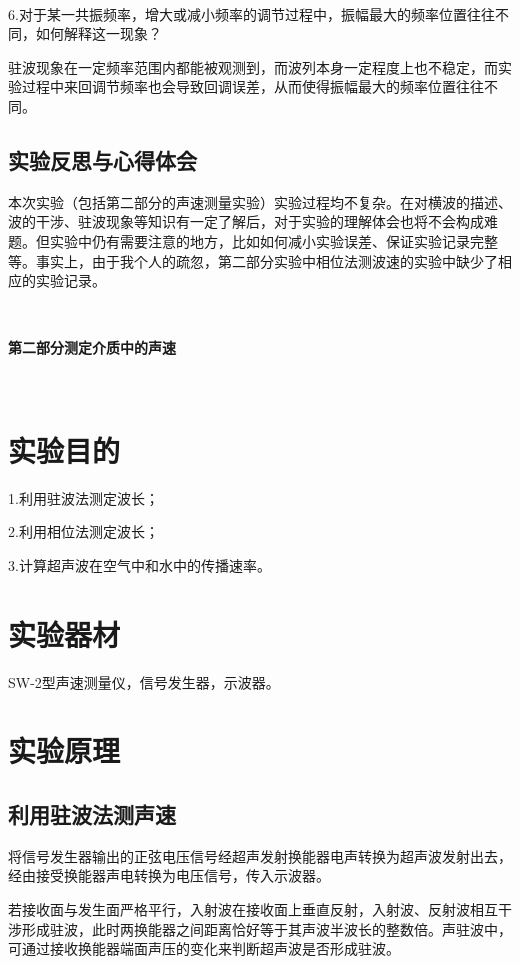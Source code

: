 \documentclass[UTF-8,twoside,cs4size]{ctexart}
\begin{document}
	~\
	
	6.对于某一共振频率，增大或减小频率的调节过程中，振幅最大的频率位置往往不同，如何解释这一现象？
	
	{\kaishu 驻波现象在一定频率范围内都能被观测到，而波列本身一定程度上也不稳定，而实验过程中来回调节频率也会导致回调误差，从而使得振幅最大的频率位置往往不同。}
	\subsection{实验反思与心得体会}
	本次实验（包括第二部分的声速测量实验）实验过程均不复杂。在对横波的描述、波的干涉、驻波现象等知识有一定了解后，对于实验的理解体会也将不会构成难题。但实验中仍有需要注意的地方，比如如何减小实验误差、保证实验记录完整等。事实上，由于我个人的疏忽，第二部分实验中相位法测波速的实验中缺少了相应的实验记录。
	
	\newpage
	
	~\
	
	\begin{center}
		\Large\bfseries 第二部分\quad 测定介质中的声速
	\end{center}
	\setcounter{section}{0}
	~\

	\section{实验目的}
	1.利用驻波法测定波长；
	
	2.利用相位法测定波长；
	
	3.计算超声波在空气中和水中的传播速率。
	
	\section{实验器材}
	SW-2型声速测量仪，信号发生器，示波器。
	
	\section{实验原理}
	\subsection{利用驻波法测声速}
	将信号发生器输出的正弦电压信号经超声发射换能器电声转换为超声波发射出去，经由接受换能器声电转换为电压信号，传入示波器。
	
	若接收面与发生面严格平行，入射波在接收面上垂直反射，入射波、反射波相互干涉形成驻波，此时两换能器之间距离恰好等于其声波半波长的整数倍。声驻波中，可通过接收换能器端面声压的变化来判断超声波是否形成驻波。
	
\end{document}
